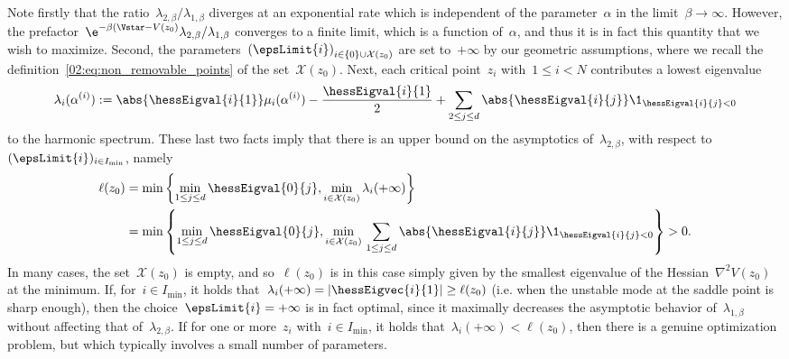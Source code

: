     Note firstly that the ratio~$\lambda_{2,\beta}/\lambda_{1,\beta}$ diverges at an exponential rate which is independent of the parameter~$\alpha$ in the limit~$\beta\to\infty$. However, the prefactor~$\e^{-\beta(\Vstar-V(z_0)}\lambda_{2,\beta}/\lambda_{1,\beta}$ converges to a finite limit, which is a function of~$\alpha$, and thus it is in fact this quantity that we wish to maximize.
    Second, the parameters~$\left(\epsLimit{i}\right)_{i\in\{0\}\cup\mathcal X(z_0)}$ are set to~$+\infty$ by our geometric assumptions, where we recall the definition~\eqref{02:eq:non_removable_points} of the set~$\mathcal X(z_0)$.
    Next, each critical point~$z_i$ with~$1\leq i<N$ contributes a lowest eigenvalue
    \[\lambda_i(\alpha^{(i)}) := \abs{\hessEigval{i}{1}}\mu_i(\alpha^{(i)})-\frac{\hessEigval{i}{1}}2 + \sum_{2\leq j\leq d}\abs{\hessEigval{i}{j}}\1_{\hessEigval{i}{j}<0}\]
    to the harmonic spectrum.
    These last two facts imply that there is an upper bound on the asymptotics of~$\lambda_{2,\beta}$, with respect to~$(\epsLimit{i})_{i\in I_{\min}}$, namely
    \begin{equation}
        \label{02:eq:upper_bound}
        \begin{split}
        \ell(z_0)  &= \min\left\{\underset{1\leq j\leq d}{\min}\,\hessEigval{0}{j},\underset{i\in\mathcal X(z_0)}{\min}\,\lambda_i(+\infty)\right\}\\
        &=\min\left\{\underset{1\leq j\leq d}{\min}\,\hessEigval{0}{j},\underset{i\in\mathcal X(z_0)}{\min}\,\sum_{1\leq j\leq d}\abs{\hessEigval{i}{j}}\1_{\hessEigval{i}{j}<0}\right\}>0.
        \end{split}
    \end{equation}
    In many cases, the set~$\mathcal X(z_0)$ is empty, and so~$\ell(z_0)$ is in this case simply given by the smallest eigenvalue of the Hessian~$\nabla^2 V(z_0)$ at the minimum.
    If, for~$i\in I_{\min}$, it holds that~$\lambda_i(+\infty)=|\hessEigvec{i}{1}|\geq\ell(z_0)$ (i.e. when the unstable mode at the saddle point is sharp enough), then the choice~$\epsLimit{i}=+\infty$ is in fact optimal, since it maximally decreases the asymptotic behavior of~$\lambda_{1,\beta}$ without affecting that of~$\lambda_{2,\beta}$.
    If for one or more~$z_i$ with~$i\in I_{\min}$, it holds that~$\lambda_i(+\infty)<\ell(z_0)$, then there is a genuine optimization problem, but which typically involves a small number of parameters.
    
